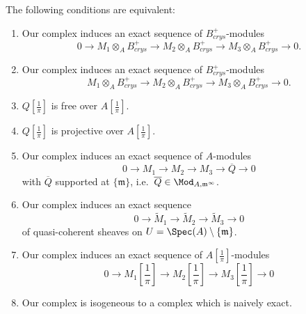\begin{prop}\label{prop:ConditionsExactAlgebraic}
The following conditions are equivalent:
\begin{enumerate}
\item \label{3.14.1} Our complex induces an exact sequence of $B_{crys}^{+}$-modules
\[
0\rightarrow M_{1}\otimes_{A}B_{crys}^{+}\rightarrow M_{2}\otimes_{A}B_{crys}^{+}\rightarrow M_{3}\otimes_{A}B_{crys}^{+}\rightarrow0.
\]
\item \label{3.14.2} Our complex induces an exact sequence of $B_{crys}^{+}$-modules
\[
M_{1}\otimes_{A}B_{crys}^{+}\rightarrow M_{2}\otimes_{A}B_{crys}^{+}\rightarrow M_{3}\otimes_{A}B_{crys}^{+}\rightarrow0.
\]
\item \label{3.14.3} $Q[\frac{1}{\pi}]$ is free over $A[\frac{1}{\pi}]$.
\item \label{3.14.4} $Q[\frac{1}{\pi}]$ is projective over $A[\frac{1}{\pi}].$
\item \label{3.14.5} Our complex induces an exact sequence of $A$-modules
\[
0\rightarrow M_{1}\rightarrow M_{2}\rightarrow M_{3}\rightarrow\overline{Q}\rightarrow0
\]
with $\overline{Q}$ supported at $\{\mathfrak{m}\}$, i.e.~$\overline{Q}\in\Mod_{A,\mathfrak{m}^{\infty}}$.
\item \label{3.14.6} Our complex induces an exact sequence
\[
0\rightarrow\tilde{M}_{1}\rightarrow\tilde{M}_{2}\rightarrow\tilde{M}_{3}\rightarrow0
\]
of quasi-coherent sheaves on $U=\Spec(A)\setminus\{\mathfrak{m}\}$.
\item \label{3.14.7} Our complex induces an exact sequence of $A[\frac{1}{\pi}]$-modules
\[
0\rightarrow M_{1}\!\left[{\frac{1}{\pi}}\right]\rightarrow M_{2}\!\left[{\frac{1}{\pi}}\right]\rightarrow M_{3}\!\left[{\frac{1}{\pi}}\right]\rightarrow0
\]
\item \label{3.14.8} Our complex is isogeneous to a complex which is naively exact.
\end{enumerate}
\end{prop}

